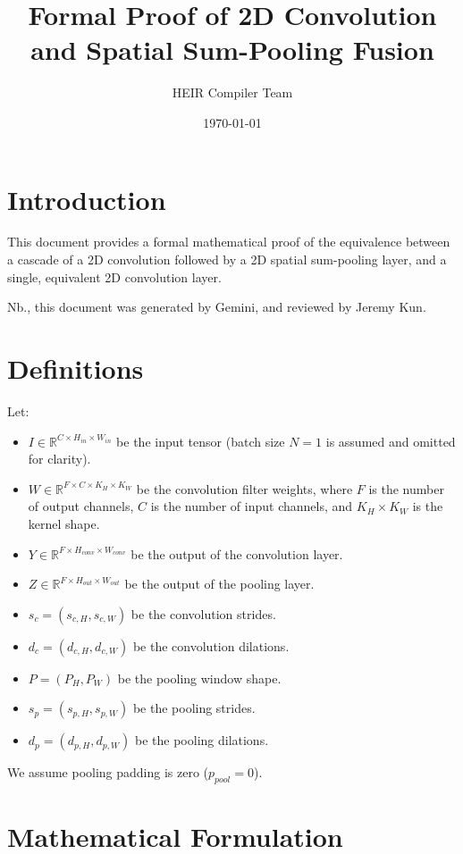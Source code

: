 \documentclass{article}
\title{Formal Proof of 2D Convolution and Spatial Sum-Pooling Fusion}
\author{HEIR Compiler Team}
\date{\today}
\begin{document}
\maketitle

\section{Introduction}
This document provides a formal mathematical proof of the equivalence between a
cascade of a 2D convolution followed by a 2D spatial sum-pooling layer, and a
single, equivalent 2D convolution layer.

Nb., this document was generated by Gemini, and reviewed by Jeremy Kun.

\section{Definitions}
Let:
\begin{itemize}
    \item $I \in \mathbb{R}^{C \times H_{in} \times W_{in}}$ be the input tensor (batch size $N=1$ is assumed and omitted for clarity).
    \item $W \in \mathbb{R}^{F \times C \times K_H \times K_W}$ be the convolution filter weights, where $F$ is the number of output channels, $C$ is the number of input channels, and $K_H \times K_W$ is the kernel shape.
    \item $Y \in \mathbb{R}^{F \times H_{conv} \times W_{conv}}$ be the output of the convolution layer.
    \item $Z \in \mathbb{R}^{F \times H_{out} \times W_{out}}$ be the output of the pooling layer.
    \item $s_c = (s_{c,H}, s_{c,W})$ be the convolution strides.
    \item $d_c = (d_{c,H}, d_{c,W})$ be the convolution dilations.
    \item $P = (P_H, P_W)$ be the pooling window shape.
    \item $s_p = (s_{p,H}, s_{p,W})$ be the pooling strides.
    \item $d_p = (d_{p,H}, d_{p,W})$ be the pooling dilations.
\end{itemize}

We assume pooling padding is zero ($p_{pool} = 0$).

\section{Mathematical Formulation}
\end{document}
